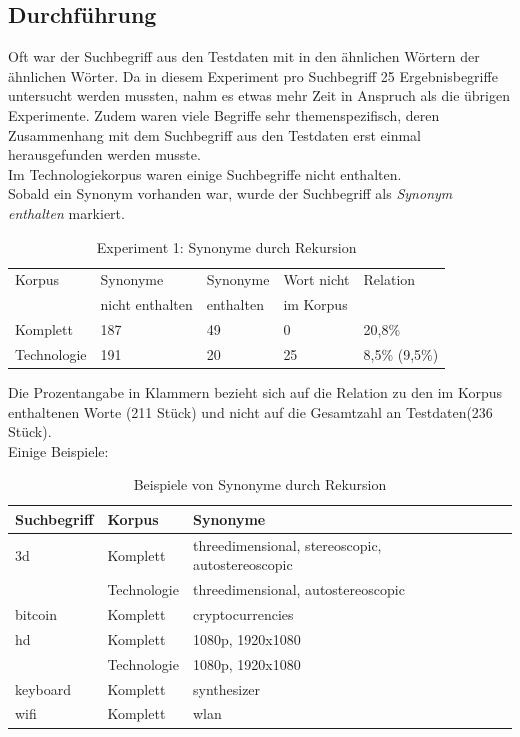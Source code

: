 \documentclass[12pt,a4paper]{report}
\begin{document}
		\subsection{Durchführung}
		Oft war der Suchbegriff aus den Testdaten mit in den ähnlichen Wörtern der ähnlichen Wörter. Da in diesem Experiment pro Suchbegriff 25 Ergebnisbegriffe untersucht werden mussten, nahm es etwas mehr Zeit in Anspruch als die übrigen Experimente. Zudem waren viele Begriffe sehr themenspezifisch, deren Zusammenhang mit dem Suchbegriff aus den Testdaten erst einmal herausgefunden werden musste.\\
		Im Technologiekorpus waren einige Suchbegriffe nicht enthalten.\\
		Sobald ein Synonym vorhanden war, wurde der Suchbegriff als \textit{Synonym enthalten} markiert.
	
\begin{table}[h]
\caption{Experiment 1: Synonyme durch Rekursion}
\begin{center}
\begin{tabular}{|l||l|l|l|l|}
\hline
Korpus & Synonyme & Synonyme  & Wort nicht  & Relation\\
 & nicht enthalten & enthalten & im Korpus & \\

\hline
 Komplett & 187 & 49 & 0 & 20,8\% \\
 \hline
 Technologie & 191 & 20 & 25 & 8,5\% (9,5\%)\\
 \hline
 
\end{tabular}
\end{center}
\end{table}
		Die Prozentangabe in Klammern bezieht sich auf die Relation zu den im Korpus enthaltenen Worte (211 Stück) und nicht auf die Gesamtzahl an Testdaten(236 Stück).\\
		
Einige Beispiele:\\
 
\begin{table}[h]
\caption{Beispiele von Synonyme durch Rekursion}
\begin{center}
\begin{tabular}{|l||l|l|l|l|}
\hline
Suchbegriff & Korpus & Synonyme   \\

\hline
 3d & Komplett & threedimensional, stereoscopic, autostereoscopic \\
  	& Technologie& threedimensional, autostereoscopic\\
 \hline	
 bitcoin	& Komplett	& cryptocurrencies	\\
 	\hline
 hd	 & Komplett 	& 1080p, 1920x1080 \\
  	 & Technologie	& 1080p, 1920x1080 \\
 	\hline
 keyboard	& Komplett & synthesizer	\\
 	\hline
 wifi	&	Komplett &	wlan\\
 	\hline
 
\end{tabular}
\end{center}
\end{table}
		
\end{document}

